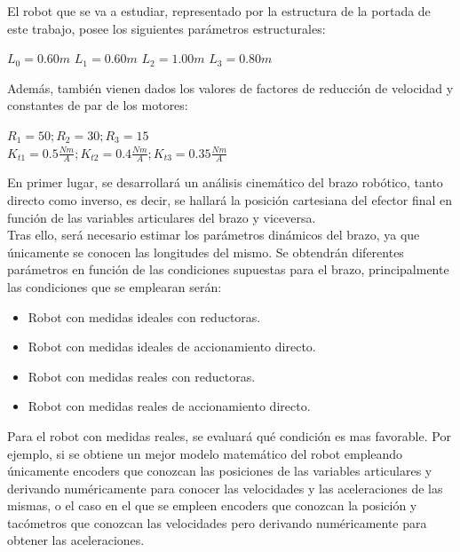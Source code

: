 \documentclass[a4paper,twoside]{article}
\begin{document}
	El robot que se va a estudiar, representado por la estructura de la portada de este trabajo, posee los siguientes parámetros estructurales:
	\begin{center}
		$L_0 = 0.60 m$ \hspace{0.5 cm} $L_1 = 0.60 m$ \hspace{0.5 cm}  $L_2 = 1.00 m$\hspace{0.5 cm}  $L_3 = 0.80 m$
	\end{center}
	
	Además, también vienen dados los valores de factores de reducción de velocidad y constantes de par de los motores:
	\begin{center}
		$R_1 = 50; R_2 = 30; R_3 = 15$\\ \vspace{0.2 cm}
		$K_{t1} = 0.5 \frac{Nm}{A}; K_{t2} = 0.4 \frac{Nm}{A}; K_{t3} = 0.35 \frac{Nm}{A}$
	\end{center}

En primer lugar, se desarrollará un análisis cinemático del brazo robótico, tanto directo como inverso, es decir, se hallará la posición cartesiana del efector final en función de las variables articulares del brazo y viceversa.\\
Tras ello, será necesario estimar los parámetros dinámicos del brazo, ya que únicamente se conocen las longitudes del mismo. Se obtendrán diferentes parámetros en función de las condiciones supuestas para el brazo, principalmente las condiciones que se emplearan serán:
\begin{itemize}
	\item Robot con medidas ideales con reductoras.
	\item Robot con medidas ideales de accionamiento directo.
	\item Robot con medidas reales con reductoras.
	\item Robot con medidas reales de accionamiento directo.
\end{itemize}
Para el robot con medidas reales, se evaluará qué condición es mas favorable. Por ejemplo, si se obtiene un mejor modelo matemático del robot empleando únicamente encoders que conozcan las posiciones de las variables articulares y derivando numéricamente para conocer las velocidades y las aceleraciones de las mismas, o el caso en el que se empleen encoders que conozcan la posición y tacómetros que conozcan las velocidades pero derivando numéricamente para obtener las aceleraciones.\\
\end{document}
